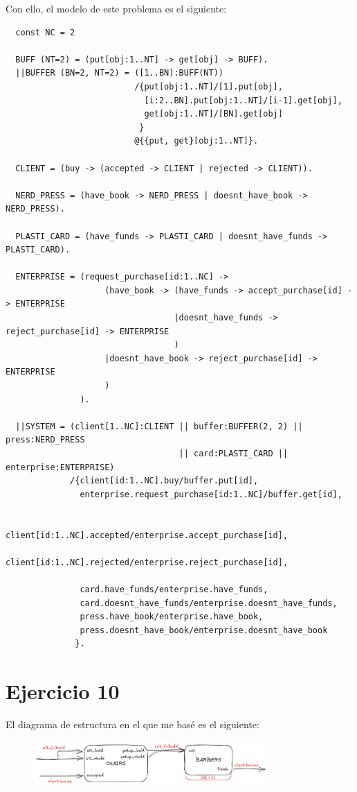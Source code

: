 \documentclass{article}
\begin{document}
Con ello, el modelo de este problema es el siguiente:
\begin{verbatim}
  const NC = 2 
  
  BUFF (NT=2) = (put[obj:1..NT] -> get[obj] -> BUFF).
  ||BUFFER (BN=2, NT=2) = ([1..BN]:BUFF(NT))
                          /{put[obj:1..NT]/[1].put[obj],
                            [i:2..BN].put[obj:1..NT]/[i-1].get[obj],
                            get[obj:1..NT]/[BN].get[obj]
                           }
                          @{{put, get}[obj:1..NT]}.

  CLIENT = (buy -> (accepted -> CLIENT | rejected -> CLIENT)).

  NERD_PRESS = (have_book -> NERD_PRESS | doesnt_have_book -> NERD_PRESS).

  PLASTI_CARD = (have_funds -> PLASTI_CARD | doesnt_have_funds -> PLASTI_CARD).

  ENTERPRISE = (request_purchase[id:1..NC] -> 
                    (have_book -> (have_funds -> accept_purchase[id] -> ENTERPRISE
                                  |doesnt_have_funds -> reject_purchase[id] -> ENTERPRISE
                                  )
                    |doesnt_have_book -> reject_purchase[id] -> ENTERPRISE
                    )
               ).

  ||SYSTEM = (client[1..NC]:CLIENT || buffer:BUFFER(2, 2) || press:NERD_PRESS
                                   || card:PLASTI_CARD || enterprise:ENTERPRISE)
             /{client[id:1..NC].buy/buffer.put[id],
               enterprise.request_purchase[id:1..NC]/buffer.get[id],

               client[id:1..NC].accepted/enterprise.accept_purchase[id],
               client[id:1..NC].rejected/enterprise.reject_purchase[id],

               card.have_funds/enterprise.have_funds,
               card.doesnt_have_funds/enterprise.doesnt_have_funds,
               press.have_book/enterprise.have_book,
               press.doesnt_have_book/enterprise.doesnt_have_book
              }.
\end{verbatim}

\section*{Ejercicio 10}
El diagrama de estructura en el que me basé es el siguiente:
\begin{figure}[!htb]
	\includegraphics[width=0.8\textwidth]{02-10.png}
	\centering
\end{figure}
\end{document}
